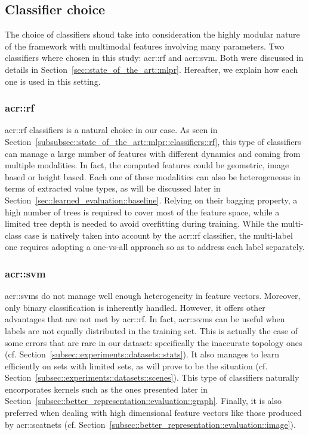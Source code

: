     \subsection{Classifier choice}
        \label{subsec::learned_evaluation::classification::classifiers}
        The choice of classifiers shoud take into consideration the highly modular nature of the framework with multimodal features involving many parameters.
        Two classifiers where chosen in this study: \gls{acr::rf} and \gls{acr::svm}.
        Both were discussed in details in Section~\ref{sec::state_of_the_art::mlpr}.
        Hereafter, we explain how each one is used in this setting.\\

        \subsubsection{\acrlong*{acr::rf}}
            \gls{acr::rf} classifiers is a natural choice in our case.
            As seen in Section~\ref{subsubsec::state_of_the_art::mlpr::classifiers::rf}, this type of classifiers can manage a large number of features with different dynamics and coming from multiple modalities.
            In fact, the computed features could be geometric, image based or height based.
            Each one of these modalities can also be heterogeneous in terms of extracted value types, as will be discussed later in Section~\ref{sec::learned_evaluation::baseline}.
            Relying on their bagging property, a high number of trees is required to cover most of the feature space, while a limited tree depth is needed to avoid overfitting during training.
            While the multi-class case is natively taken into account by the \gls{acr::rf} classifier, the multi-label one requires adopting a one-vs-all approach so as to address each label separately.

        \subsubsection{\acrshort*{acr::svm}}
            \glspl{acr::svm} do not manage well enough heterogeneity in feature vectors.
            Moreover, only binary classification is inherently handled.
            However, it offers other advantages that are not met by \gls{acr::rf}.
            In fact, \glspl{acr::svm} can be useful when labels are not equally distributed in the training set.
            This is actually the case of some errors that are rare in our dataset: specifically the inaccurate topology ones (cf. Section~\ref{subsec::experiments::datasets::stats}).
            It also manages to learn efficiently on sets with limited sets, as will prove to be the situation (cf. Section~\ref{subsec::experiments::datasets::scenes}). 
            This type of classifiers naturally encorporates kernels such as the ones presented later in Section~\ref{subsec::better_representation::evaluation::graph}.
            Finally, it is also preferred when dealing with high dimensional feature vectors like those produced by \glspl{acr::scatnet} (cf. Section~\ref{subsec::better_representation::evaluation::image}).

